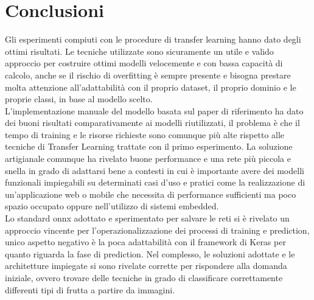 \section{Conclusioni}

Gli esperimenti compiuti con le procedure di transfer learning hanno dato degli ottimi risultati. Le tecniche utilizzate sono sicuramente un utile e valido approccio per costruire ottimi modelli velocemente e con bassa capacità di calcolo, anche se il rischio di overfitting è sempre presente e bisogna prestare molta attenzione all'adattabilità con il proprio dataset, il proprio dominio e le proprie classi, in base al modello scelto. \\
L'implementazione manuale del modello basata sul paper di riferimento ha dato dei buoni risultati comparativamente ai modelli riutilizzati, il problema è che il tempo di training e le risorse richieste sono comunque più alte rispetto alle tecniche di Transfer Learning trattate con il primo esperimento.
La soluzione artigianale comunque ha rivelato buone performance e una rete più piccola e snella in grado di adattarsi bene a contesti in cui è importante avere dei modelli funzionali impiegabili su determinati casi d'uso e pratici come la realizzazione di un'applicazione web o mobile che necessita di performance sufficienti ma poco spazio occupato oppure nell'utilizzo di sistemi embedded. \\
Lo standard onnx adottato e sperimentato per salvare le reti si è rivelato un approccio vincente per l'operazionalizzazione dei processi di training e prediction, unico aspetto negativo è la poca adattabilità con il framework di Keras per quanto riguarda la fase di prediction.
Nel complesso, le soluzioni adottate e le architetture impiegate si sono rivelate corrette per rispondere alla domanda iniziale, ovvero trovare delle tecniche in grado di classificare correttamente differenti tipi di frutta a partire da immagini.





